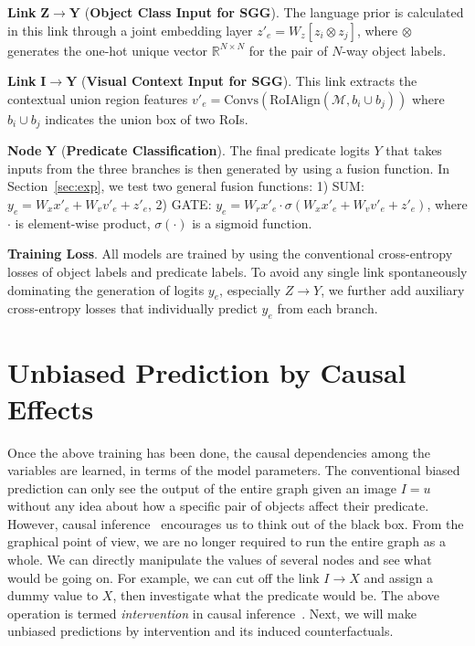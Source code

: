 \documentclass[10pt,twocolumn,letterpaper]{article}
\begin{document}
\noindent\textbf{Link} $\bm{Z\to Y}$ (\textbf{Object Class Input for SGG}). The language prior is calculated in this link through a joint embedding layer $z'_{e}=W_z[z_i \otimes z_j]$, where $\otimes$ generates the one-hot unique vector $\mathbb{R}^{N\times N}$ for the pair of $N$-way object labels.

\noindent\textbf{Link} $\bm{I\to Y}$ (\textbf{Visual Context Input for SGG}). This link extracts the contextual union region features $v'_{e}=\text{Convs}(\text{RoIAlign}(\mathcal{M},b_i \cup b_j))$ where $b_i \cup b_j$ indicates the union box of two RoIs.

\noindent\textbf{Node} $\bm{Y}$ (\textbf{Predicate Classification}). The final predicate logits $Y$ that takes inputs from the three branches is then generated by using a fusion function. In Section~\ref{sec:exp}, we test two general fusion functions: 1) SUM: $y_{e}=W_x x'_{e} + W_v v'_{e} + z'_{e}$, 2) GATE:  $y_{e}= W_r x'_{e} \cdot \sigma(W_x x'_{e} + W_v v'_{e} + z'_{e})$, where $\cdot$ is element-wise product, $\sigma(\cdot)$ is a sigmoid function.

\noindent\textbf{Training Loss}. All models are trained by using the conventional cross-entropy losses of object labels and predicate labels. To avoid any single link spontaneously dominating the generation of logits $y_{e}$, especially $Z\to Y$, we further add auxiliary cross-entropy losses that individually predict $y_{e}$ from each branch. 

\section{Unbiased Prediction by Causal Effects}
\label{sec:unbiased_pred}
Once the above training has been done, the causal dependencies among the variables are learned, in terms of the model parameters. The conventional biased prediction can only see the output of the entire graph given an image $I=u$ without any idea about how a specific pair of objects affect their predicate. However, causal inference~\cite{Judea2018thebookofwhy} encourages us to think out of the black box. From the graphical point of view, we are no longer required to run the entire graph as a whole. We can directly manipulate the values of several nodes and see what would be going on. For example, we can cut off the link $I\to X$ and assign a dummy value to $X$, then investigate what the predicate would be. The above operation is termed \emph{intervention} in causal inference~\cite{pearl2016causal}. Next, we will make unbiased predictions by intervention and its induced counterfactuals.
\end{document}
